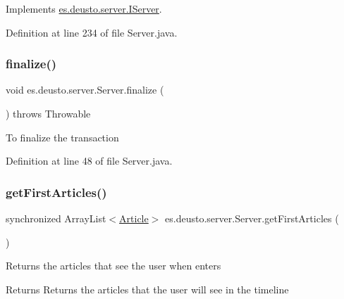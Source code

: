 Implements \hyperlink{interfacees_1_1deusto_1_1server_1_1_i_server_ab5c4258f62146d90a064604891cedf2f}{es.\+deusto.\+server.\+I\+Server}.



Definition at line 234 of file Server.\+java.

\mbox{\label{classes_1_1deusto_1_1server_1_1_server_a168b866b961a3d54b38834db9b52ca80}} 
\subsubsection{\texorpdfstring{finalize()}{finalize()}}
{\footnotesize\ttfamily void es.\+deusto.\+server.\+Server.\+finalize (\begin{DoxyParamCaption}{ }\end{DoxyParamCaption}) throws Throwable\hspace{0.3cm}{\ttfamily [protected]}}

To finalize the transaction 

Definition at line 48 of file Server.\+java.

\mbox{\label{classes_1_1deusto_1_1server_1_1_server_a64dfcee7821b0cc581367c1b21d9f97f}} 
\subsubsection{\texorpdfstring{get\+First\+Articles()}{getFirstArticles()}}
{\footnotesize\ttfamily synchronized Array\+List$<$\hyperlink{classes_1_1deusto_1_1server_1_1jdo_1_1_article}{Article}$>$ es.\+deusto.\+server.\+Server.\+get\+First\+Articles (\begin{DoxyParamCaption}{ }\end{DoxyParamCaption})}

Returns the articles that see the user when enters

\begin{DoxyReturn}{Returns}
Returns the articles that the user will see in the timeline 
\end{DoxyReturn}


